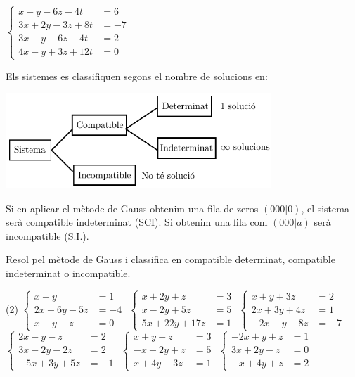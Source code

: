 \begin{mylist}
\begin{tasks}
	\task $\left\{\begin{array}{ll} x+y-6z-4t&=6 \\ 3x+2y-3z+8t&=-7 \\ 3x-y-6z-4t&=2 \\ 4x-y+3z+12t&=0 \end{array}\right.$ 
	\end{tasks}

 
\begin{theorybox}
	Els sistemes es classifiquen segons el nombre de solucions en:
	\begin{center}
		\includegraphics[width=10cm]{img-02/classificacio-sistemes.pdf}
	\end{center}

Si en aplicar el mètode de Gauss obtenim una fila de zeros $(0 0 0 | 0)$, el sistema serà compatible indeterminat (SCI). Si obtenim  una fila com  $(0 0 0 | a)$ serà incompatible (S.I.).
\end{theorybox}

 \exer {} Resol pel mètode de Gauss i classifica en compatible determinat, compatible indeterminat o incompatible.
\begin{tasks}(2)
	\task  $\left\{\begin{array}{ll} x-y&=1 \\ 2x+6y-5z&=-4 \\ x+y-z&=0 \end{array}\right. $       
\task  $\left\{\begin{array}{ll} x+2y+z&=3 \\ x-2y+5z&=5 \\ 5x+22y+17z&=1 \end{array}\right. $ 
\task  $\left\{\begin{array}{ll} x+y+3z&=2 \\ 2x+3y+4z&=1 \\ -2x-y-8z&=-7 \end{array}\right. $        
\task  $\left\{\begin{array}{ll} 2x-y-z&=2 \\ 3x-2y-2z&=2 \\ -5x+3y+5z&=-1 \end{array}\right. $ 
\task  $\left\{\begin{array}{ll} x+y+z&=3 \\ -x+2y+z&=5 \\ x+4y+3z&=1 \end{array}\right. $ 
\task  $\left\{\begin{array}{ll} -2x+y+z&=1 \\ 3x+2y-z&=0 \\ -x+4y+z&=2 \end{array}\right. $ 
\end{tasks}




\end{mylist}
